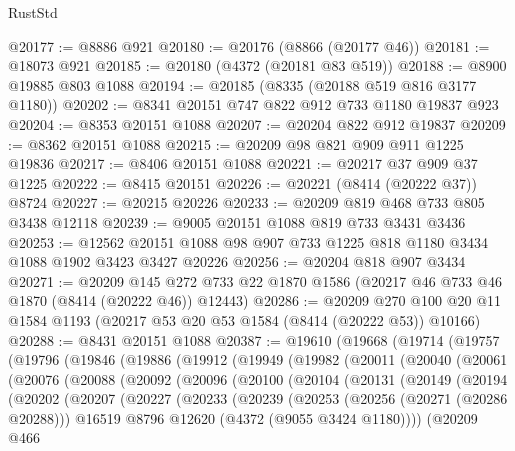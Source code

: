 \begin{lexlean}{RustStd}
\begin{coremodule}
@20177 := @8886 @921
@20180 := @20176 (@8866 (@20177 @46))
@20181 := @18073 @921
@20185 := @20180 (@4372 (@20181 @83 @519))
@20188 := @8900 @19885 @803 @1088
@20194 := @20185 (@8335 (@20188 @519 @816 @3177 @1180))
@20202 := @8341 @20151 @747 @822 @912 @733 @1180 @19837 @923
@20204 := @8353 @20151 @1088
@20207 := @20204 @822 @912 @19837
@20209 := @8362 @20151 @1088
@20215 := @20209 @98 @821 @909 @911 @1225 @19836
@20217 := @8406 @20151 @1088
@20221 := @20217 @37 @909 @37 @1225
@20222 := @8415 @20151
@20226 := @20221 (@8414 (@20222 @37)) @8724
@20227 := @20215 @20226
@20233 := @20209 @819 @468 @733 @805 @3438 @12118
@20239 := @9005 @20151 @1088 @819 @733 @3431 @3436
@20253 := @12562 @20151 @1088 @98 @907 @733 @1225 @818 @1180 @3434 @1088 @1902 @3423 @3427 @20226
@20256 := @20204 @818 @907 @3434
@20271 := @20209
    @145
    @272
    @733
    @22
    @1870
    @1586
    (@20217 @46 @733 @46 @1870 (@8414 (@20222 @46)) @12443)
@20286 := @20209
    @270
    @100
    @20
    @11
    @1584
    @1193
    (@20217 @53 @20 @53 @1584 (@8414 (@20222 @53)) @10166)
@20288 := @8431 @20151 @1088
@20387 := @19610
    (@19668
      (@19714
        (@19757
          (@19796
            (@19846
              (@19886
                (@19912
                  (@19949
                    (@19982
                      (@20011
                        (@20040
                          (@20061
                            (@20076
                              (@20088
                                (@20092
                                  (@20096
                                    (@20100
                                      (@20104
                                        (@20131
                                          (@20149
                                            (@20194
                                              (@20202
                                                (@20207
                                                  (@20227
                                                    (@20233
                                                      (@20239
                                                        (@20253
                                                          (@20256 (@20271 (@20286 @20288)))
                                                          @16519
                                                          @8796
                                                          @12620
                                                          (@4372 (@9055 @3424 @1180))))
                                                      (@20209
                                                        @466

\end{coremodule}
\end{lexlean}
